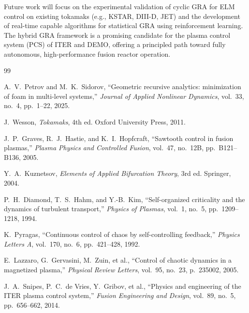 \documentclass[12pt,a4paper]{article}
\begin{document}
Future work will focus on the experimental validation of cyclic GRA for ELM control on existing tokamaks (e.g., KSTAR, DIII-D, JET) and the development of real-time capable algorithms for statistical GRA using reinforcement learning. The hybrid GRA framework is a promising candidate for the plasma control system (PCS) of ITER and DEMO, offering a principled path toward fully autonomous, high-performance fusion reactor operation.

\begin{thebibliography}{99}

A.~V.~Petrov and M.~K.~Sidorov, ``Geometric recursive analytics: minimization of foam in multi-level systems,'' \textit{Journal of Applied Nonlinear Dynamics}, vol.~33, no.~4, pp.~1--22, 2025.

J.~Wesson, \textit{Tokamaks}, 4th ed. Oxford University Press, 2011.

J.~P.~Graves, R.~J.~Hastie, and K.~I.~Hopfcraft, ``Sawtooth control in fusion plasmas,'' \textit{Plasma Physics and Controlled Fusion}, vol.~47, no.~12B, pp.~B121--B136, 2005.

Y.~A.~Kuznetsov, \textit{Elements of Applied Bifurcation Theory}, 3rd ed. Springer, 2004.

P.~H.~Diamond, T.~S.~Hahm, and Y.-B.~Kim, ``Self-organized criticality and the dynamics of turbulent transport,'' \textit{Physics of Plasmas}, vol.~1, no.~5, pp.~1209--1218, 1994.

K.~Pyragas, ``Continuous control of chaos by self-controlling feedback,'' \textit{Physics Letters A}, vol.~170, no.~6, pp.~421--428, 1992.

E.~Lazzaro, G.~Gervasini, M.~Zuin, et al., ``Control of chaotic dynamics in a magnetized plasma,'' \textit{Physical Review Letters}, vol.~95, no.~23, p.~235002, 2005.

J.~A.~Snipes, P.~C.~de Vries, Y.~Gribov, et al., ``Physics and engineering of the ITER plasma control system,'' \textit{Fusion Engineering and Design}, vol.~89, no.~5, pp.~656--662, 2014.

\end{thebibliography}
\end{document}
